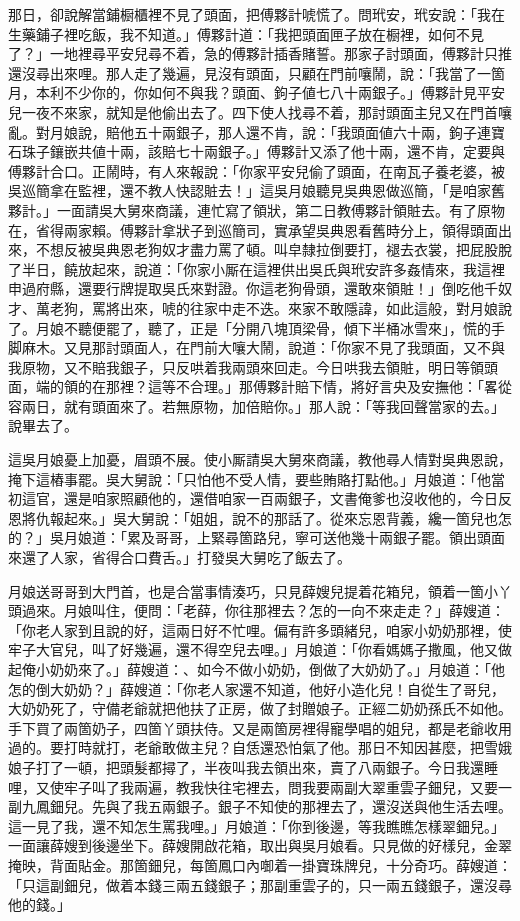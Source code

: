 那日，卻說解當鋪橱櫃裡不見了頭面，把傅夥計唬慌了。問玳安，玳安說：「我在生藥鋪子裡吃飯，我不知道。」傅夥計道：「我把頭面匣子放在橱裡，如何不見了？」一地裡尋平安兒尋不着，急的傅夥計插香賭誓。那家子討頭面，傅夥計只推還沒尋出來哩。那人走了幾遍，見沒有頭面，只顧在門前嚷鬧，說：「我當了一箇月，本利不少你的，你如何不與我？頭面、鉤子値七八十兩銀子。」傅夥計見平安兒一夜不來家，就知是他偷出去了。四下使人找尋不着，那討頭面主兒又在門首嚷亂。對月娘說，賠他五十兩銀子，那人還不肯，說：「我頭面値六十兩，鉤子連寶石珠子鑲嵌共値十兩，該賠七十兩銀子。」傅夥計又添了他十兩，還不肯，定要與傅夥計合口。正鬧時，有人來報說：「你家平安兒偷了頭面，在南瓦子養老婆，被吳巡簡拿在監裡，還不教人快認賍去！」這吳月娘聽見吳典恩做巡簡，「是咱家舊夥計。」一面請吳大舅來商議，連忙寫了領狀，第二日教傅夥計領賍去。有了原物在，省得兩家賴。傅夥計拿狀子到巡簡司，實承望吳典恩看舊時分上，領得頭面出來，不想反被吳典恩老狗奴才盡力罵了頓。叫皁隸拉倒要打，褪去衣裳，把屁股脫了半日，饒放起來，說道：「你家小厮在這裡供出吳氏與玳安許多姦情來，我這裡申過府縣，還要行牌提取吳氏來對證。你這老狗骨頭，還敢來領賍！」{}倒吃他千奴才、萬老狗，罵將出來，唬的往家中走不迭。來家不敢隱諱，如此這般，對月娘說了。月娘不聽便罷了，聽了，正是「分開八塊頂梁骨，傾下半桶冰雪來」，慌的手脚麻木。又見那討頭面人，在門前大嚷大鬧，說道：「你家不見了我頭面，又不與我原物，又不賠我銀子，只反哄着我兩頭來回走。今日哄我去領賍，明日等領頭面，端的領的在那裡？這等不合理。」那傅夥計賠下情，將好言央及安撫他：「畧從容兩日，就有頭面來了。若無原物，加倍賠你。」那人說：「等我回聲當家的去。」說畢去了。

這吳月娘憂上加憂，眉頭不展。使小厮請吳大舅來商議，教他尋人情對吳典恩說，掩下這樁事罷。吳大舅說：「只怕他不受人情，要些賄賂打點他。」月娘道：「他當初這官，還是咱家照顧他的，還借咱家一百兩銀子，文書俺爹也沒收他的，今日反恩將仇報起來。」吳大舅說：「姐姐，說不的那話了。從來忘恩背義，纔一箇兒也怎的？」{}吳月娘道：「累及哥哥，上緊尋箇路兒，寧可送他幾十兩銀子罷。領出頭面來還了人家，省得合口費舌。」打發吳大舅吃了飯去了。

月娘送哥哥到大門首，也是合當事情湊巧，只見薛嫂兒提着花箱兒，領着一箇小丫頭過來。月娘叫住，便問：「老薛，你往那裡去？怎的一向不來走走？」薛嫂道：「你老人家到且說的好，這兩日好不忙哩。偏有許多頭緒兒，咱家小奶奶那裡，使牢子大官兒，叫了好幾遍，還不得空兒去哩。」月娘道：「你看媽媽子撒風，他又做起俺小奶奶來了。」薛嫂道：、如今不做小奶奶，倒做了大奶奶了。」月娘道：「他怎的倒大奶奶？」薛嫂道：「你老人家還不知道，他好小造化兒！自從生了哥兒，大奶奶死了，守備老爺就把他扶了正房，做了封贈娘子。正經二奶奶孫氏不如他。手下買了兩箇奶子，四箇丫頭扶侍。又是兩箇房裡得寵學唱的姐兒，都是老爺收用過的。要打時就打，老爺敢做主兒？自恁還恐怕氣了他。那日不知因甚麼，把雪娥娘子打了一頓，把頭髮都撏了，半夜叫我去領出來，賣了八兩銀子。今日我還睡哩，又使牢子叫了我兩遍，教我快往宅裡去，問我要兩副大翠重雲子鈿兒，又要一副九鳳鈿兒。先與了我五兩銀子。銀子不知使的那裡去了，還沒送與他生活去哩。這一見了我，還不知怎生罵我哩。」月娘道：「你到後邊，等我瞧瞧怎樣翠鈿兒。」一面讓薛嫂到後邊坐下。薛嫂開啟花箱，取出與吳月娘看。只見做的好樣兒，金翠掩映，背面貼金。那箇鈿兒，每箇鳳口內啣着一掛寶珠牌兒，十分奇巧。薛嫂道：「只這副鈿兒，做着本錢三兩五錢銀子；那副重雲子的，只一兩五錢銀子，還沒尋他的錢。」

